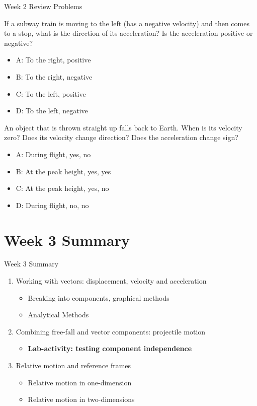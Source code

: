 \documentclass{beamer}
\begin{document}
\begin{frame}{Week 2 Review Problems}
\small
\begin{minipage}[b]{0.45\linewidth}
If a subway train is moving to the left (has a negative velocity) and then comes to a stop, what is the direction of its acceleration? Is the acceleration positive or negative?
\begin{itemize}
\vspace{0.5cm}
\item A: To the right, positive
\item B: To the right, negative
\item C: To the left, positive
\item D: To the left, negative
\end{itemize}
\end{minipage}
\hspace{0.5cm}
\begin{minipage}[b]{0.45\linewidth}
An object that is thrown straight up falls back to Earth.  When is its velocity zero?  Does its velocity change direction?  Does the acceleration change sign?
\begin{itemize}
\item A: During flight, yes, no
\item B: At the peak height, yes, yes
\item C: At the peak height, yes, no
\item D: During flight, no, no
\end{itemize}
\end{minipage}
\end{frame}

\section{Week 3 Summary}

\begin{frame}{Week 3 Summary}
\begin{enumerate}
\item Working with vectors: displacement, velocity and acceleration
\begin{itemize}
\item Breaking into components, graphical methods
\item Analytical Methods
\end{itemize}
\item Combining free-fall and vector components: \alert{projectile motion}
\begin{itemize}
\item \textbf{Lab-activity: testing component independence}
\end{itemize}
\item Relative motion and reference frames
\begin{itemize}
\item Relative motion in one-dimension
\item Relative motion in two-dimensions
\end{itemize}
\end{enumerate}
\end{frame}
\end{document}
